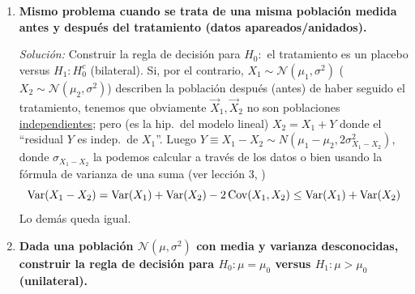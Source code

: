 \begin{enumerate}
  \smallskip
  \noindent\emph{Solución:} \noindent\underline{Contraste bilateral de media de la diferencia con varianza conocida.}

  Si llamamos $X_1 \sim N(\mu_1, \sigma^2)$ ($X_2 \sim \mathcal N(\mu_2, \sigma^2)$) la población que sí (no) ha seguido el tratamiento, tenemos que son poblaciones \underline{independientes}, luego $Y \equiv X_1 - X_2 \sim \mathcal N(\mu_1 - \mu_2, 2\sigma^2)$.

  Las hipótesis a contrastar son ($\mu \equiv \mu_1 - \mu_2$)
  \begin{align*}
    H_0 &= \text{``el tratamiento es un placebo''} \iff \mu_1 - \mu_2 = 0; \quad X_1 - X_2 \sim \mathcal N(0, 2\sigma^2) \\
    H_1 &= \text{``el tratamiento no es un placebo''} \iff \mu \neq 0
  \end{align*}
  Usa el pivote
  \[
    P \coloneqq \frac{\overline{Y}}{\sqrt{2n}\sigma} \sim \mathcal N(0, 1)
  \]
  Rechazaremos si bajo $H_0$ es
  \[
    \overline{x}_1 - \overline{x}_2 \notin \bigl(-\sqrt{2n}\,a,\, \sqrt{2n}\,a\bigr),
  \]
  pues
  \[
    \Prob(|P_n| \leq a) = \alpha \implies a = \Phi^{-1}\bigl((1 + \alpha)/2\bigr)
  \]

  \item \textbf{Mismo problema cuando se trata de una misma población medida antes y después del tratamiento (datos apareados/anidados).}

  \smallskip
  \noindent\emph{Solución:} Construir la regla de decisión para $H_0:$ el tratamiento es un placebo versus $H_1 : H_0^c$ (bilateral).
  Si, por el contrario, $X_1 \sim \mathcal N(\mu_1, \sigma^2)$ ($X_2 \sim \mathcal N(\mu_2, \sigma^2)$) describen la población después (antes) de haber seguido el tratamiento, tenemos que obviamente $\vec{X}_1, \vec{X}_2$ no son poblaciones \underline{independientes}; pero (es la hip.\ del modelo lineal) $X_2 = X_1 + Y$ donde el ``residual $Y$ es indep.\ de $X_1$''. Luego $Y \equiv X_1 - X_2 \sim N(\mu_1 - \mu_2, 2\sigma_{X_1 - X_2}^2)$, donde $\sigma_{X_1 - X_2}$ la podemos calcular a través de los datos o bien usando la fórmula de varianza de una suma (ver lección 3, )
  \[
    \operatorname{Var}(X_1 - X_2) = \operatorname{Var}(X_1) + \operatorname{Var}(X_2) - 2\operatorname{Cov}(X_1, X_2) \leq \operatorname{Var}(X_1) + \operatorname{Var}(X_2)
  \]
  Lo demás queda igual.

  \item \textbf{Dada una población $\mathcal{N}(\mu, \sigma^2)$ con media y varianza desconocidas, construir la regla de decisión para $H_0 : \mu = \mu_0$ versus $H_1 : \mu > \mu_0$ (unilateral).}


\end{enumerate}
